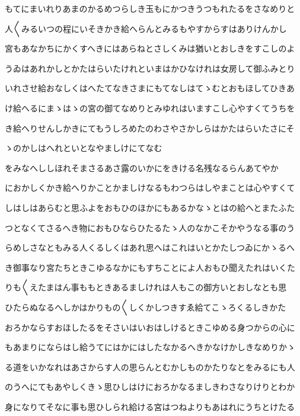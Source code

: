\documentclass[a4paper,11pt,landscape]{ltjtarticle}
\begin{document}
\par\medskip
もてにまいれりあまのかるめつらしき玉もにかつきうつもれたるをさなめりと
\par\medskip
人〱みるいつの程にいそきかき給へらんとみるもやすからすはありけんかし
\par\medskip
宮もあなかちにかくすへきにはあらねとさしくみは猶いとおしきをすこしのよ
\par\medskip
うゐはあれかしとかたはらいたけれといまはかひなけれは女房して御ふみとり
\par\medskip
いれさせ給おなしくはへたてなきさまにもてなしはてゝむとおもほしてひきあ
\par\medskip
け給へるにまゝはゝの宮の御てなめりとみゆれはいますこし心やすくてうちを
\par\medskip
き給へりせんしかきにてもうしろめたのわさやさかしらはかたはらいたさにそ
\par\medskip
ゝのかしはへれといとなやましけにてなむ
\par\medskip
をみなへししほれそまさるあさ露のいかにをきける名残なるらんあてやか
\par\medskip
におかしくかき給へりかことかましけなるもわつらはしやまことは心やすくて
\par\medskip
しはしはあらむと思ふよをおもひのほかにもあるかなゝとはの給へとまたふた
\par\medskip
つとなくてさるへき物におもひならひたるたゝ人のなかこそかやうなる事のう
\par\medskip
らめしさなともみる人くるしくはあれ思へはこれはいとかたしつゐにかゝるへ
\par\medskip
き御事なり宮たちときこゆるなかにもすちことによ人おもひ聞えたれはいくた
\par\medskip
りも〱えたまはん事ももときあるましけれは人もこの御方いとおしなとも思
\par\medskip
ひたらぬなるへしかはかりもの〱しくかしつきすゑ給てこゝろくるしきかた
\par\medskip
おろかならすおほしたるをそさいはいおはしけるときこゆめる身つからの心に
\par\medskip
もあまりにならはし給うてにはかにはしたなかるへきかなけかしきなめりかゝ
\par\medskip
る道をいかなれはあさからす人の思らんとむかしものかたりなとをみるにも人
\par\medskip
のうへにてもあやしくきゝ思ひしはけにおろかなるましきわさなりけりとわか
\par\medskip
身になりてそなに事も思ひしられ給ける宮はつねよりもあはれにうちとけたる
\par\medskip
\end{document}
